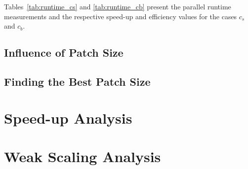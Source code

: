 \documentclass[a4paper,%
11pt,%
DIV12,
headsepline,%
headings=normal,
]{scrartcl}
\begin{document}
Tables~\ref{tab:runtime_cs} and \ref{tab:runtime_cb} present the parallel runtime measurements and the respective speed-up and efficiency values for the cases $c_s$ and $c_b$.


\subsection{Influence of Patch Size}

\subsection{Finding the Best Patch Size}

\section{Speed-up Analysis}

\section{Weak Scaling Analysis}
\end{document}
